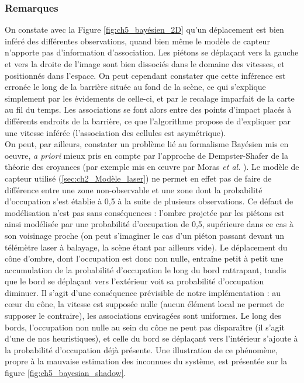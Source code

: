 \subsubsection{Remarques}
On constate avec la Figure \ref{fig:ch5_bayésien_2D} qu'un déplacement est bien inféré des différentes observations, quand bien même le modèle de capteur n'apporte pas d'information d'association. Les piétons se déplaçant vers la gauche et vers la droite de l'image sont bien dissociés dans le domaine des vitesses, et positionnés dans l'espace. On peut cependant constater que cette inférence est erronée le long de la barrière située au fond de la scène, ce qui s'explique simplement par les évidements de celle-ci, et par le recalage imparfait de la carte au fil du temps. Les associations se font alors entre des points d'impact placés à différents endroits de la barrière, ce que l'algorithme propose de d'expliquer par une vitesse inférée (l'association des cellules est asymétrique).\\

On peut, par ailleurs, constater un problème lié au formalisme Bayésien mis en oeuvre, \textit{a priori} mieux pris en compte par l'approche de Dempster-Shafer de la théorie des croyances (par exemple mis en œuvre par Moras \textit{et al. }\cite{Moras2011a}). Le modèle de capteur utilisé (\ref{sec:ch2_Modèle_laser}) ne permet en effet pas de faire de différence entre une zone non-observable et une zone dont la probabilité d'occupation s'est établie à 0,5 à la suite de plusieurs observations. Ce défaut de modélisation n'est pas sans conséquences : l'ombre projetée par les piétons est ainsi modélisée par une probabilité d'occupation de 0,5, supérieure dans ce cas à son voisinage proche (on peut s'imaginer le cas d'un piéton passant devant un télémètre laser à balayage, la scène étant par ailleurs vide). Le déplacement du \og cône\fg{} d'ombre, dont l'occupation est donc non nulle, entraîne petit à petit une accumulation de la probabilité d'occupation le long du bord \og rattrapant\fg{}, tandis que le bord se déplaçant vers l'extérieur voit sa probabilité d'occupation diminuer. Il s'agit d'une conséquence prévisible de notre implémentation : au cœur du cône, la vitesse est supposée nulle (aucun élément local ne permet de supposer le contraire), les associations envisagées sont uniformes. Le long des bords, l'occupation non nulle au sein du cône ne peut pas disparaître (il s'agit d'une de nos heuristiques), et celle du bord se déplaçant vers l'intérieur s'ajoute à la probabilité d'occupation déjà présente. Une illustration de ce phénomène, propre à la mauvaise estimation des inconnues du système, est présentée sur la figure \ref{fig:ch5_bayesian_shadow}.\\

